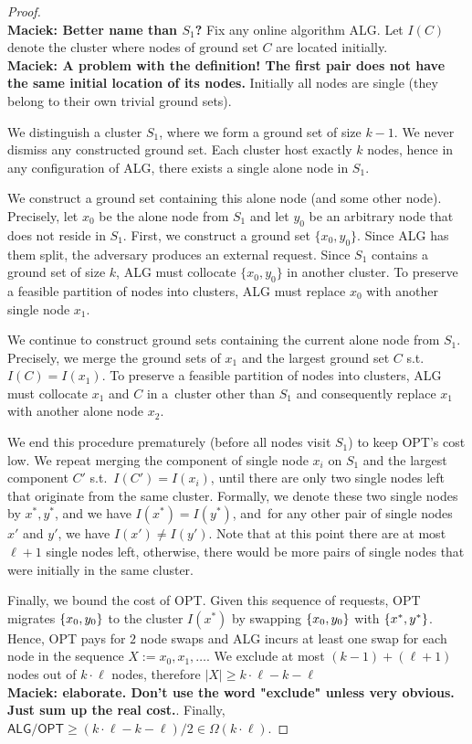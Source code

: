 \documentclass[manuscript,screen=true, review, anonymous]{acmart}
\newcommand{\OPT}{\textsf{OPT}\xspace}
\newcommand{\ALG}{\textsf{ALG}\xspace}
\DeclarePairedDelimiter\set{\{}{\}}
\newcommand\maciek[1]{\color{brown}\textbf{\\ Maciek: #1}\color{black}}
\begin{document}
\begin{proof}
	\maciek{Better name than $S_1$?}
	Fix any online algorithm \ALG{}.
	Let $I(C)$ denote the cluster where nodes of ground set $C$ are located initially.
	\maciek{A problem with the definition! The first pair does not have the same initial location of its nodes.}
	Initially all nodes are single (they belong to their own trivial ground sets).

	We distinguish a cluster $S_1$, where we form a ground set of size $k-1$.
	We never dismiss any constructed ground set.
	Each cluster host exactly $k$ nodes, hence in any configuration of \ALG, there exists a single alone node in $S_1$.

	We construct a ground set containing this alone node (and some other node).
	Precisely, let $x_0$  be the alone node from $S_1$ and let $y_0$ be an arbitrary node that does not reside in $S_1$.
	First,
	we construct a ground set $\{x_0, y_0\}$.
	Since \ALG{} has them split, the adversary produces an external request.
	Since $S_1$ contains a ground set of size $k$, \ALG{} must collocate $\{x_0, y_0\}$ in another cluster.
	To preserve a feasible partition of nodes into clusters,
	\ALG must replace $x_0$ with another single node $x_1$.
	
	We continue to construct ground sets containing the current alone node from $S_1$.
	Precisely, we merge the ground sets of $x_1$ and the largest ground set $C$ s.t.~$I(C) = I(x_1)$.
	To preserve a feasible partition of nodes into clusters,
	\ALG{} must collocate $x_1$ and $C$ in a~cluster other than $S_1$ and
	consequently replace $x_1$ with another alone node $x_2$.

	We end this procedure prematurely (before all nodes visit $S_1$) to keep \OPT's cost low.
	We repeat merging the component of single node $x_i$ on $S_1$ and the largest component $C'$ s.t.~$I(C')=I(x_i)$,
	until there are only two single nodes left that  originate from the same cluster.
	Formally, we denote these two single nodes by $x^*, y^*$, and we have $I(x^*) = I(y^*)$, and~for any other pair of single nodes
	$x'$ and $y'$,
	we have $I(x') \neq I(y')$.
	Note that at this point there are at most $\ell+1$ single nodes left,
	otherwise, there would be more pairs of single nodes that were initially in the same cluster.
	
	Finally, we bound the cost of \OPT.
	Given this sequence of requests,
	\OPT migrates $\set{x_0,y_0}$ to the cluster $I(x^*)$ by
	swapping $\set{x_0,y_0}$ with $\set{x^*,y^*}$.
	Hence,
	OPT pays for $2$ node swaps and
	\ALG{} incurs at least one swap for each node in the sequence $X := x_0, x_1,\dots$.
	We exclude at most $(k-1) + ( \ell+1)$ nodes out of $k \cdot \ell$ nodes,
	therefore $|X| \geq k \cdot \ell - k - \ell$ \maciek{elaborate. Don't use the word "exclude" unless very obvious. Just sum up the real cost.}.
	Finally, $\ALG/\OPT \geq (k \cdot \ell - k - \ell) / 2\in \Omega(k\cdot\ell)$.
\end{proof}
\end{document}
